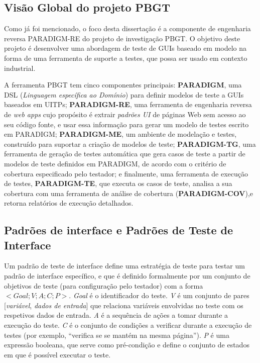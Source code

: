 \documentclass[9pt,a4paper]{extarticle}
\begin{document}
\begin{multicols}{2}
\subsection{Visão Global do projeto PBGT}\label{sec:pbgt}
Como já  foi mencionado, o foco desta dissertação é a componente de engenharia reversa PARADIGM-RE do projeto de investigação PBGT. O objetivo deste projeto é desenvolver uma abordagem de teste de GUIs baseado em modelo na forma de uma ferramenta de suporte a testes, que possa ser usado em contexto industrial.

A ferramenta PBGT tem cinco componentes principais: 
\textbf{PARADIGM}, uma DSL (\textit{Linguagem específica ao Domínio}) para definir modelos de teste a GUIs baseados em UITPs; \textbf{PARADIGM-RE}, uma ferramenta de engenharia reversa de \textit{web apps} cujo propósito é extrair \textit{padrões UI} de páginas Web sem acesso ao seu código fonte, e usar essa informação para gerar um modelo de testes escrito em PARADIGM; \textbf{PARADIGM-ME}, um ambiente de modelação e testes, construído para suportar a criação de modelos de teste; \textbf{PARADIGM-TG}, uma ferramenta de geração de testes automática que gera casos de teste a partir de modelos de teste definidos em PARADIGM, de acordo com o critério de cobertura especificado pelo testador; e finalmente, uma ferramenta de execução de testes, \textbf{PARADIGM-TE}, que executa os casos de teste, analisa a sua cobertura com uma ferramenta de análise de cobertura (\textbf{PARADIGM-COV}),e retorna relatórios de execução detalhados.

\subsection{Padrões de interface e Padrões de Teste de Interface}
Um padrão de teste de interface define uma estratégia de teste para testar um padrão de interface específico, e que é definido formalmente por um conjunto de objetivos de teste (para configuração pelo testador) com a forma $< Goal; V; A; C; P >$. \textit{Goal} é o identificador do teste. \textit{V} é um conjunto de pares { [\textit{variável}, \textit{dados de entrada}] } que relaciona variáveis envolvidas no teste com os respetivos dados de entrada. \textit{A} é a sequência de ações a tomar durante a execução do teste. \textit{C} é o conjunto de condições a verificar durante a execução de testes (por exemplo, “verifica se se mantém na mesma página”). \textit{P} é uma expressão booleana, que serve como pré-condição e define o conjunto de estados em que é possível executar o teste. 


\end{multicols}
\end{document}
